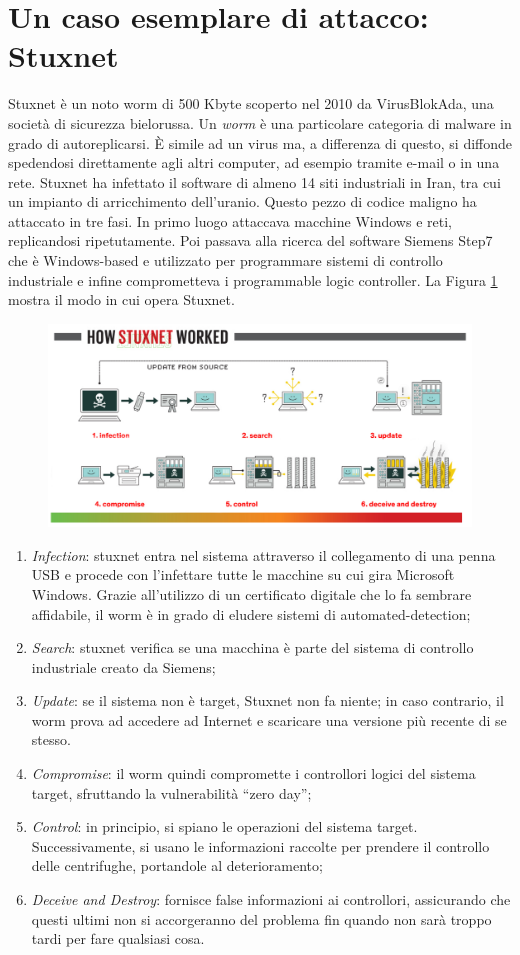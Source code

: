 \section{Un caso esemplare di attacco: Stuxnet}
Stuxnet è un noto worm di 500 Kbyte scoperto nel 2010 da VirusBlokAda, una società di sicurezza bielorussa. Un \emph{worm} è una particolare categoria di malware in grado di autoreplicarsi. È simile ad un virus ma, a differenza di questo, si diffonde spedendosi direttamente agli altri computer, ad esempio tramite e-mail o in una rete.  Stuxnet ha infettato il software di almeno 14 siti industriali in Iran, tra cui un impianto di arricchimento dell'uranio. Questo pezzo di codice maligno ha attaccato in tre fasi. In primo luogo attaccava macchine Windows e reti, replicandosi ripetutamente. Poi passava alla ricerca del software Siemens Step7 che è Windows-based e utilizzato per programmare sistemi di controllo industriale e infine comprometteva i programmable logic controller. La Figura \ref{fig:stxhsw} mostra il modo in cui opera Stuxnet.
\begin{figure}[h]
	\centering
	\includegraphics[scale=0.350]{imgs/stuxnet_hsw.png}
	\caption{}\label{fig:stxhsw}
\end{figure}
\begin{enumerate}
	\item\emph{Infection}: stuxnet entra nel sistema attraverso il collegamento di una penna USB e procede con l'infettare tutte le macchine su cui gira Microsoft Windows. Grazie all'utilizzo di un certificato digitale che lo fa sembrare affidabile, il worm è in grado di eludere sistemi di automated-detection;
	\item\emph{Search}: stuxnet verifica se una macchina è parte del sistema di controllo industriale creato da Siemens;
	\item\emph{Update}: se il sistema non è target, Stuxnet non fa niente; in caso contrario, il worm prova ad accedere ad Internet e scaricare una versione più recente di se stesso.
	\item\emph{Compromise}: il worm quindi compromette i controllori logici del sistema target, sfruttando la vulnerabilità ``zero day'';
	\item\emph{Control}: in principio, si spiano le operazioni del sistema target. Successivamente, si usano le informazioni raccolte per prendere il controllo delle centrifughe, portandole al deterioramento;
	\item\emph{Deceive and Destroy}: fornisce false informazioni ai controllori, assicurando che questi ultimi non si accorgeranno del problema fin quando non sarà troppo tardi per fare qualsiasi cosa.
\end{enumerate}
